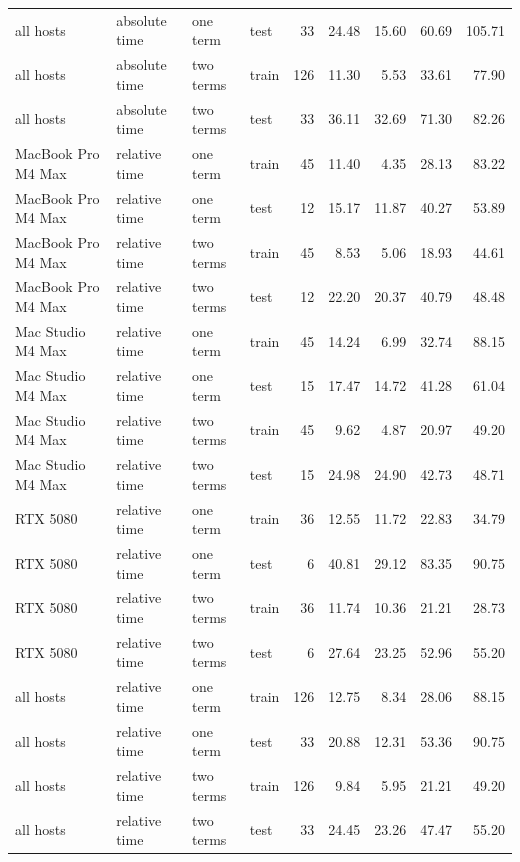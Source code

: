 \documentclass[10pt]{article}
\begin{document}
\begin{center}
\begin{tabular}{llllrrrrr}
all hosts & absolute time & one term & test & 33 & 24.48 & 15.60 & 60.69 & 105.71 \\
all hosts & absolute time & two terms & train & 126 & 11.30 & 5.53 & 33.61 & 77.90 \\
all hosts & absolute time & two terms & test & 33 & 36.11 & 32.69 & 71.30 & 82.26 \\
MacBook Pro M4 Max & relative time & one term & train & 45 & 11.40 & 4.35 & 28.13 & 83.22 \\
MacBook Pro M4 Max & relative time & one term & test & 12 & 15.17 & 11.87 & 40.27 & 53.89 \\
MacBook Pro M4 Max & relative time & two terms & train & 45 & 8.53 & 5.06 & 18.93 & 44.61 \\
MacBook Pro M4 Max & relative time & two terms & test & 12 & 22.20 & 20.37 & 40.79 & 48.48 \\
Mac Studio M4 Max & relative time & one term & train & 45 & 14.24 & 6.99 & 32.74 & 88.15 \\
Mac Studio M4 Max & relative time & one term & test & 15 & 17.47 & 14.72 & 41.28 & 61.04 \\
Mac Studio M4 Max & relative time & two terms & train & 45 & 9.62 & 4.87 & 20.97 & 49.20 \\
Mac Studio M4 Max & relative time & two terms & test & 15 & 24.98 & 24.90 & 42.73 & 48.71 \\
RTX 5080 & relative time & one term & train & 36 & 12.55 & 11.72 & 22.83 & 34.79 \\
RTX 5080 & relative time & one term & test & 6 & 40.81 & 29.12 & 83.35 & 90.75 \\
RTX 5080 & relative time & two terms & train & 36 & 11.74 & 10.36 & 21.21 & 28.73 \\
RTX 5080 & relative time & two terms & test & 6 & 27.64 & 23.25 & 52.96 & 55.20 \\
all hosts & relative time & one term & train & 126 & 12.75 & 8.34 & 28.06 & 88.15 \\
all hosts & relative time & one term & test & 33 & 20.88 & 12.31 & 53.36 & 90.75 \\
all hosts & relative time & two terms & train & 126 & 9.84 & 5.95 & 21.21 & 49.20 \\
all hosts & relative time & two terms & test & 33 & 24.45 & 23.26 & 47.47 & 55.20 \\
\bottomrule
\end{tabular}
\end{center}
\end{document}
